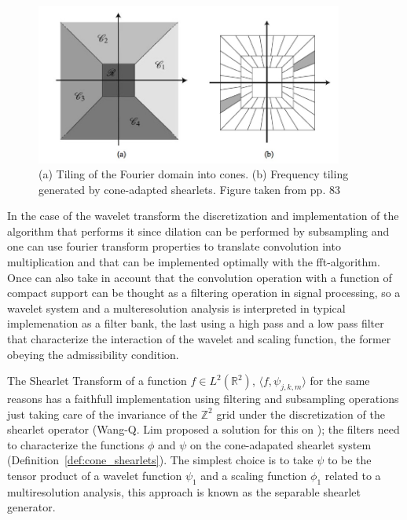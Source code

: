 \begin{figure}[!tbp]
  \centering
   \includegraphics[width=0.9\textwidth]{./Diagrams/tiling_cone.jpg}
    \caption{(a) Tiling of the Fourier domain into cones. (b) Frequency tiling generated by cone-adapted shearlets. Figure taken from \cite{Gitta-notes} pp. 83 }
  \label{fig:tiling_cone}
\end{figure}

\bigskip

In the case of the wavelet transform the discretization and implementation of the algorithm that performs it since dilation can be performed by subsampling and one can use fourier transform properties to translate convolution into multiplication and that can be implemented optimally with the fft-algorithm. Once can also take in account that the convolution operation with a function of compact support can be thought as a filtering operation in signal processing, so a wavelet system and a multeresolution analysis  is interpreted in typical implemenation as a filter bank, the last using a high pass and a low pass filter that characterize the interaction of the wavelet and scaling function, the former obeying the admissibility condition. 

\bigskip

The Shearlet Transform of a function $f\in L^2(\mathbb{R}^2)$, $\langle f,\psi_{j,k,m}\rangle$ for the same reasons has a faithfull implementation using filtering and subsampling operations just taking care of the invariance of the $\mathbb{Z}^2$ grid under the discretization of the shearlet operator (Wang-Q. Lim proposed a solution for this on \cite{Nonseparableshear}); the filters need to characterize the functions $\phi$ and $\psi$ on the cone-adapated shearlet system (Definition~\ref{def:cone_shearlets}). The simplest choice is to take $\psi$ to be the tensor product of a wavelet function $\psi_1$ and a scaling function $\phi_1$ related to a multiresolution analysis, this approach is known as the separable shearlet generator. 

